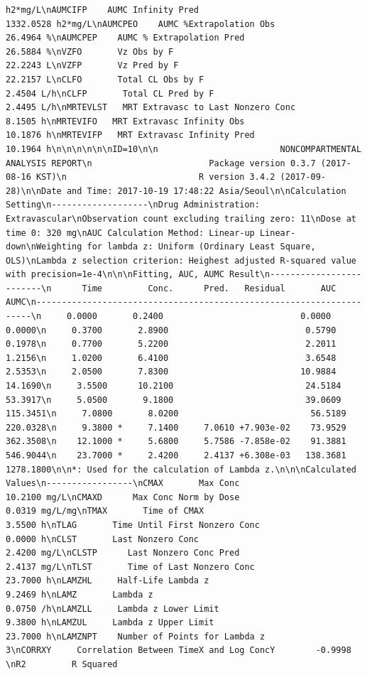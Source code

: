\documentclass[]{krantz}
\theoremstyle{definition}
\theoremstyle{definition}
\theoremstyle{definition}
\theoremstyle{remark}
\begin{document}
\begin{verbatim}
h2*mg/L\nAUMCIFP    AUMC Infinity Pred                           1332.0528 h2*mg/L\nAUMCPEO    AUMC %Extrapolation Obs                        26.4964 %\nAUMCPEP    AUMC % Extrapolation Pred                      26.5884 %\nVZFO       Vz Obs by F                                    22.2243 L\nVZFP       Vz Pred by F                                   22.2157 L\nCLFO       Total CL Obs by F                               2.4504 L/h\nCLFP       Total CL Pred by F                              2.4495 L/h\nMRTEVLST   MRT Extravasc to Last Nonzero Conc              8.1505 h\nMRTEVIFO   MRT Extravasc Infinity Obs                     10.1876 h\nMRTEVIFP   MRT Extravasc Infinity Pred                    10.1964 h\n\n\n\n\n\nID=10\n\n                        NONCOMPARTMENTAL ANALYSIS REPORT\n                       Package version 0.3.7 (2017-08-16 KST)\n                          R version 3.4.2 (2017-09-28)\n\nDate and Time: 2017-10-19 17:48:22 Asia/Seoul\n\nCalculation Setting\n-------------------\nDrug Administration: Extravascular\nObservation count excluding trailing zero: 11\nDose at time 0: 320 mg\nAUC Calculation Method: Linear-up Linear-down\nWeighting for lambda z: Uniform (Ordinary Least Square, OLS)\nLambda z selection criterion: Heighest adjusted R-squared value with precision=1e-4\n\n\nFitting, AUC, AUMC Result\n-------------------------\n      Time         Conc.      Pred.   Residual       AUC       AUMC\n---------------------------------------------------------------------\n     0.0000       0.2400                           0.0000     0.0000\n     0.3700       2.8900                           0.5790     0.1978\n     0.7700       5.2200                           2.2011     1.2156\n     1.0200       6.4100                           3.6548     2.5353\n     2.0500       7.8300                          10.9884    14.1690\n     3.5500      10.2100                          24.5184    53.3917\n     5.0500       9.1800                          39.0609   115.3451\n     7.0800       8.0200                          56.5189   220.0328\n     9.3800 *     7.1400     7.0610 +7.903e-02    73.9529   362.3508\n    12.1000 *     5.6800     5.7586 -7.858e-02    91.3881   546.9044\n    23.7000 *     2.4200     2.4137 +6.308e-03   138.3681  1278.1800\n\n*: Used for the calculation of Lambda z.\n\n\nCalculated Values\n-----------------\nCMAX       Max Conc                                       10.2100 mg/L\nCMAXD      Max Conc Norm by Dose                           0.0319 mg/L/mg\nTMAX       Time of CMAX                                    3.5500 h\nTLAG       Time Until First Nonzero Conc                   0.0000 h\nCLST       Last Nonzero Conc                               2.4200 mg/L\nCLSTP      Last Nonzero Conc Pred                          2.4137 mg/L\nTLST       Time of Last Nonzero Conc                      23.7000 h\nLAMZHL     Half-Life Lambda z                              9.2469 h\nLAMZ       Lambda z                                        0.0750 /h\nLAMZLL     Lambda z Lower Limit                            9.3800 h\nLAMZUL     Lambda z Upper Limit                           23.7000 h\nLAMZNPT    Number of Points for Lambda z                   3\nCORRXY     Correlation Between TimeX and Log ConcY        -0.9998 \nR2         R Squared                                       
\end{verbatim}
\end{document}
